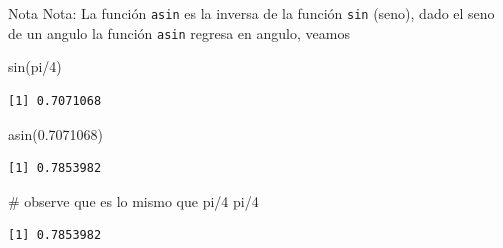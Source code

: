 \documentclass[
  ignorenonframetext,
  aspectratio=169,
  spanish,
]{beamer}
\newenvironment{Shaded}{\begin{snugshade}}{\end{snugshade}}
\newcommand{\CommentTok}[1]{\textcolor[rgb]{0.37,0.37,0.37}{#1}}
\newcommand{\DecValTok}[1]{\textcolor[rgb]{0.68,0.00,0.00}{#1}}
\newcommand{\FloatTok}[1]{\textcolor[rgb]{0.68,0.00,0.00}{#1}}
\newcommand{\FunctionTok}[1]{\textcolor[rgb]{0.28,0.35,0.67}{#1}}
\newcommand{\NormalTok}[1]{\textcolor[rgb]{0.00,0.23,0.31}{#1}}
\newcommand{\SpecialCharTok}[1]{\textcolor[rgb]{0.37,0.37,0.37}{#1}}
\begin{document}
\begin{frame}[fragile]{Nota}
\label{nota}
Nota: La función \texttt{asin} es la inversa de la función \texttt{sin}
(seno), dado el seno de un angulo la función \texttt{asin} regresa en
angulo, veamos

\begin{Shaded}
\begin{Highlighting}[]
\FunctionTok{sin}\NormalTok{(pi}\SpecialCharTok{/}\DecValTok{4}\NormalTok{) }
\end{Highlighting}
\end{Shaded}

\begin{verbatim}
[1] 0.7071068
\end{verbatim}

\begin{Shaded}
\begin{Highlighting}[]
\FunctionTok{asin}\NormalTok{(}\FloatTok{0.7071068}\NormalTok{) }
\end{Highlighting}
\end{Shaded}

\begin{verbatim}
[1] 0.7853982
\end{verbatim}

\begin{Shaded}
\begin{Highlighting}[]
\CommentTok{\# observe que es lo mismo que pi/4}
\NormalTok{pi}\SpecialCharTok{/}\DecValTok{4}
\end{Highlighting}
\end{Shaded}

\begin{verbatim}
[1] 0.7853982
\end{verbatim}
\end{frame}
\end{document}
